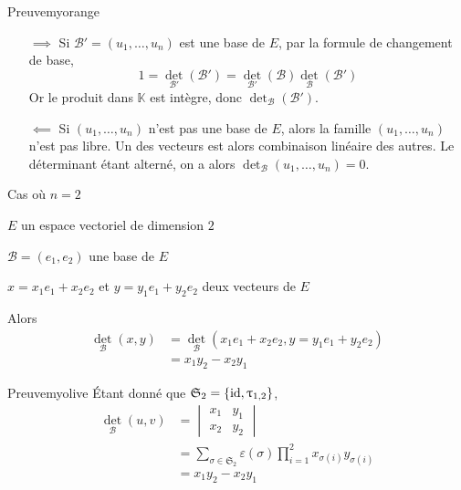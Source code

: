     \begin{demo}{Preuve}{myorange}
        \begin{itemize}
            \item[$\implies$] Si $\mathcal{B}' = (u_1,\ldots,u_n)$ est une base de $E$, par la formule de changement de base, 
            \[ 1 = \det_{\mathcal{B}'}(\mathcal{B}') = \det_{\mathcal{B}'}(\mathcal{B}) \det_{\mathcal{B}}(\mathcal{B}') \]   
            Or le produit dans $\mathbb{K}$ est intègre, donc $\det_{\mathcal{B}}(\mathcal{B}')$.
            \item[$\impliedby$] Si $(u_1,\ldots,u_n)$ n’est pas une base de $E$, alors la famille $(u_1,\ldots,u_n)$ n’est pas libre. Un des vecteurs est alors combinaison linéaire des autres. Le déterminant étant alterné, on a alors $\det_{\mathcal{B}}(u_1,\ldots,u_n) = 0$.
        \end{itemize}
    \end{demo}

    \begin{prop}{Cas où $n=2$}{}
        \begin{soient}
            \item $E$ un espace vectoriel de dimension $2$
            \item $\mathcal{B} = (e_1,e_2)$ une base de $E$
            \item $x = x_1e_1 + x_2e_2$ et $y = y_1e_1 + y_2e_2$ deux vecteurs de $E$
        \end{soient}
        Alors \begin{align*}
            \det_{\mathcal{B}}(x,y) &= \det_{\mathcal{B}}(x_1e_1 + x_2e_2, y = y_1e_1 + y_2e_2) \\
            &= x_1 y_2 - x_2 y_1
        \end{align*}
    \end{prop}

    \begin{demo}{Preuve}{myolive}
        Étant donné que $\mathfrak{S}_{2} = \left\{\operatorname{id}, \uptau_{1,2}\right\}$, 
        \begin{align*}
            \det_{\mathcal{B}}(u,v) 
            &= \begin{vmatrix}
                x_1 & y_1 \\
                x_2 & y_2
            \end{vmatrix} \\
            &= \sum_{\sigma \in \mathfrak{S}_2} \varepsilon(\sigma) \prod_{i=1}^2 x_{\sigma(i)} y_{\sigma(i)} \\
            &= x_1 y_2 - x_2 y_1
        \end{align*}
    \end{demo}

